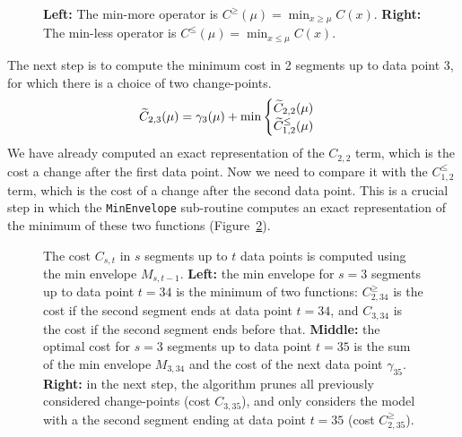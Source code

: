 \documentclass{article}
\begin{document}
\begin{figure}[!t]
  \parbox{3in}{
    \begin{center}
    
    \end{center}
  }
  \parbox{3in}{
    \begin{center}
      
    \end{center}
  }
  \caption{\label{fig:min-operators} \textbf{Left:} The min-more
    operator is $C^{\geq}(\mu)=\min_{x\geq \mu}C(x)$. \textbf{Right:}
    The min-less operator is $C^{\leq}(\mu)=\min_{x\leq
      \mu}C(x)$.}
\end{figure}

The next step is to compute the minimum cost in 2 segments up to data
point 3, for which there is a choice of two change-points.
\begin{equation*}
  \widetilde{C}_{2,3}(\mu) = \gamma_3(\mu)+\min
  \begin{cases}
    \widetilde{C}_{2,2}(\mu) \\
    \widetilde{C}_{1,2}^{\leq}(\mu)
  \end{cases}
\end{equation*}
We have already computed an exact representation of the $C_{2,2}$
term, which is the cost a change after the first data point. Now we
need to compare it with the $C_{1,2}^{\leq}$ term, which is the cost
of a change after the second data point. This is a crucial step in
which the \texttt{MinEnvelope} sub-routine computes an exact
representation of the minimum of these two functions
(Figure~\ref{fig:min-envelope}).

\begin{figure}[!t]
  \begin{center}
    
  \end{center}
  \caption{\label{fig:min-envelope} The cost $C_{s,t}$ in $s$ segments
    up to $t$ data points is computed using the min envelope
    $M_{s,t-1}$. \textbf{Left:} the min envelope for $s=3$ segments up
    to data point $t=34$ is the minimum of two functions:
    $C^{\geq}_{2,34}$ is the cost if the second segment ends at data
    point $t=34$, and $C_{3,34}$ is the cost if the second segment
    ends before that. \textbf{Middle:} the optimal cost for $s=3$
    segments up to data point $t=35$ is the sum of the min envelope
    $M_{3,34}$ and the cost of the next data point
    $\gamma_{35}$. \textbf{Right:} in the next step, the
    algorithm prunes all previously considered change-points (cost
    $C_{3,35}$), and only considers the model with a the second segment
    ending at data point $t=35$ (cost $C^{\geq}_{2,35}$).}
\end{figure}
\end{document}
